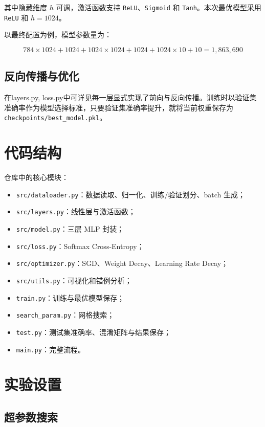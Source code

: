 \documentclass[UTF8,a4paper,12pt]{ctexart}
\begin{document}
其中隐藏维度 $h$ 可调，激活函数支持 \texttt{ReLU}、\texttt{Sigmoid} 和 \texttt{Tanh}。本次最优模型采用 \texttt{ReLU} 和 $h=1024$。

以最终配置为例，模型参数量为：

\begin{equation}
784 \times 1024 + 1024 + 1024 \times 1024 + 1024 + 1024 \times 10 + 10 = 1{,}863{,}690
\end{equation}

\subsection{反向传播与优化}

在layers.py, loss.py中可详见每一层显式实现了前向与反向传播。训练时以验证集准确率作为模型选择标准，只要验证集准确率提升，就将当前权重保存为 \texttt{checkpoints/best\_model.pkl}。

\section{代码结构}

仓库中的核心模块：

\begin{itemize}
    \item \texttt{src/dataloader.py}：数据读取、归一化、训练/验证划分、batch 生成；
    \item \texttt{src/layers.py}：线性层与激活函数；
    \item \texttt{src/model.py}：三层 MLP 封装；
    \item \texttt{src/loss.py}：Softmax Cross-Entropy；
    \item \texttt{src/optimizer.py}：SGD、Weight Decay、Learning Rate Decay；
    \item \texttt{src/utils.py}：可视化和错例分析；
    \item \texttt{train.py}：训练与最优模型保存；
    \item \texttt{search\_param.py}：网格搜索；
    \item \texttt{test.py}：测试集准确率、混淆矩阵与结果保存；
    \item \texttt{main.py}：完整流程。
\end{itemize}

\section{实验设置}

\subsection{超参数搜索}
\end{document}
